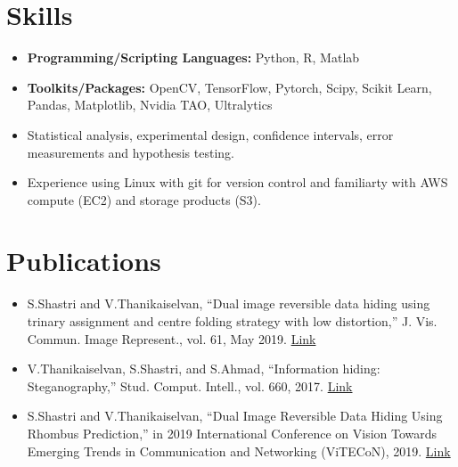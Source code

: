 \documentclass[a4paper,11pt]{article}
\begin{document}
\section{Skills}
	\begin{itemize}[leftmargin=*, itemsep = -2pt]
		\item{\textbf{Programming/Scripting Languages:}{ Python, R, Matlab}}
		\item{\textbf{Toolkits/Packages:}{ OpenCV, TensorFlow, Pytorch, Scipy, Scikit Learn, Pandas, Matplotlib, Nvidia TAO, Ultralytics}}
		\item{Statistical analysis, experimental design, confidence intervals, error measurements and hypothesis testing.}
    \item{Experience using Linux with git for version control and familiarty with AWS compute (EC2) and storage products (S3).}
	\end{itemize}

\section{Publications}
	\begin{itemize}[leftmargin=*, itemsep = -4pt]
    \item{S.Shastri and V.Thanikaiselvan, “Dual image reversible data hiding using trinary assignment and centre folding strategy with low distortion,” J. Vis. Commun. Image Represent., vol. 61, May 2019. \href{https://doi.org/10.1016/j.jvcir.2019.03.022}{Link}}
		\item{V.Thanikaiselvan, S.Shastri, and S.Ahmad, “Information hiding: Steganography,” Stud. Comput. Intell., vol. 660, 2017. \href{https://doi.org/10.1007/978-3-319-44790-2\_4}{Link}}
    \item{S.Shastri and V.Thanikaiselvan, “Dual Image Reversible Data Hiding Using Rhombus Prediction,” in 2019 International Conference on Vision Towards Emerging Trends in Communication and Networking (ViTECoN), 2019. \href{https://doi.org/10.1109/ViTECoN.2019.8899667}{Link}}
   \end{itemize}
\end{document}
